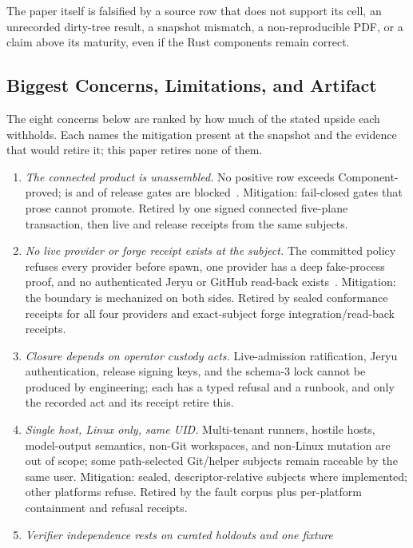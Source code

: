 \documentclass[journal]{IEEEtran}
\newcommand{\ComponentProved}{\textsf{Component-proved}}
\newcommand{\code}[1]{\texttt{\detokenize{#1}}}
\begin{document}
The paper itself is falsified by a source row that does not support its cell,
an unrecorded dirty-tree result, a snapshot mismatch, a non-reproducible PDF,
or a claim above its maturity, even if the Rust components remain correct.

\subsection{Biggest Concerns, Limitations, and Artifact}
\label{sec:concerns}

The eight concerns below are ranked by how much of the stated upside each
withholds. Each names the mitigation present at the snapshot and the evidence
that would retire it; this paper retires none of them.

\begin{enumerate}
\item \emph{The connected product is unassembled.} No positive row exceeds
\ComponentProved; \code{TRANSACTION_PROOF} is \EvidenceTransactionOutcome{}
and \EvidenceReleaseBlocked{} of \EvidenceReleaseEvaluated{} release gates are
blocked~\cite{bulletRelease}. Mitigation: fail-closed gates that prose cannot
promote. Retired by one signed connected five-plane transaction, then live and
release receipts from the same subjects.
\item \emph{No live provider or forge receipt exists at the subject.} The
committed policy refuses every provider before spawn, one provider has a deep
fake-process proof, and no authenticated Jeryu or GitHub read-back
exists~\cite{bulletPolicy,bulletClosure}. Mitigation: the boundary is
mechanized on both sides. Retired by sealed conformance receipts for all four
providers and exact-subject forge integration/read-back receipts.
\item \emph{Closure depends on operator custody acts.} Live-admission
ratification, Jeryu authentication, release signing keys, and the schema-3
lock cannot be produced by engineering; each has a typed refusal and a runbook,
and only the recorded act and its receipt retire this.
\item \emph{Single host, Linux only, same UID.} Multi-tenant runners, hostile
hosts, model-output semantics, non-Git workspaces, and non-Linux mutation are
out of scope; some path-selected Git/helper subjects remain raceable by the
same user. Mitigation: sealed, descriptor-relative subjects where implemented;
other platforms refuse. Retired by the fault corpus plus per-platform
containment and refusal receipts.
\item \emph{Verifier independence rests on curated holdouts and one fixture
}
\end{enumerate}
\end{document}
